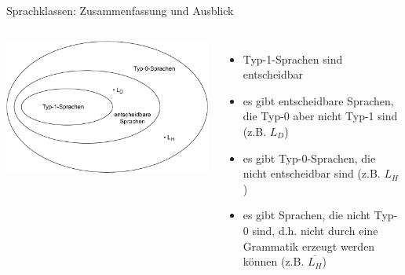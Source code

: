 \begin{frame}{Sprachklassen: Zusammenfassung und Ausblick}
	\begin{columns}
		\centering
		\includegraphics[width=0.9\linewidth]{images/Sprachklassen_Typ0_Typ1}
		\begin{itemize}
			\item Typ-1-Sprachen sind entscheidbar
			\item es gibt entscheidbare Sprachen, die Typ-0 aber nicht Typ-1 sind (z.B. $L_D$)
			\item es gibt Typ-0-Sprachen, die nicht entscheidbar sind (z.B. $L_H$)
			\item es gibt Sprachen, die nicht Typ-0 sind, d.h. nicht durch eine Grammatik erzeugt werden können (z.B. $\overline{L_H}$)
		\end{itemize}
	\end{columns}
\end{frame}